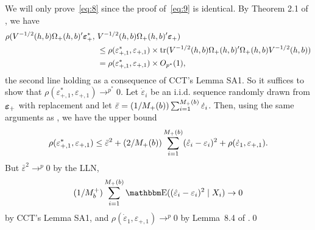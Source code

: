 \documentclass[12pt,fleqn]{article}
\begin{document}
We will only prove~\eqref{eq:8} since the proof of~\eqref{eq:9} is
identical. By Theorem 2.1 of \cite{freedman1981}, we have
\begin{align*}
  \rho(V^{-1/2}(h,b) \Omega_+(h,b)'\epb_{+}^{*},\
  &V^{-1/2}(h,b) \Omega_+(h,b)'\epb_{+}) \\
  &\leq \rho(\varepsilon_{+,1}^{*}, \varepsilon_{+,1}) \times
    \tr(V^{-1/2}(h,b) \Omega_+(h,b)' \Omega_+(h,b)V^{-1/2}(h,b)) \\
  &= \rho(\varepsilon_{+,1}^{*}, \varepsilon_{+,1}) \times O_{p^{*}}(1),
\end{align*}
the second line holding as a consequence of CCT's Lemma SA1. So it suffices
to show that $\rho(\varepsilon_{+,1}^{*}, \varepsilon_{+,1}) \to^{p^{*}} 0$. Let
$\dot{\varepsilon}_i$ be an i.i.d. sequence randomly drawn from $\epb_+$
with replacement and let
$\bar{\varepsilon} = (1/M_+(b)) \osum[+]{i}{b} \dot{\varepsilon}_i$. Then,
using the same arguments as \cite{freedman1981}, we have the upper bound
\begin{equation*}
  \rho(\varepsilon_{+,1}^*, \varepsilon_{+,1})
  \leq
  \bar\varepsilon^2 +
  (2/M_+(b)) \osum[+]{i}{b} (\hat\varepsilon_i - \varepsilon_i)^2
  + \rho(\dot\varepsilon_1, \varepsilon_{+,1}).
\end{equation*}
But $\bar\varepsilon^2 \to^p 0$ by the LLN,
\[
  (1/M_{b}^+) \osum[+]{i}{b}
  \E((\hat\varepsilon_i - \varepsilon_i)^2 \mid X_i) \to 0
\]
by CCT's Lemma SA1, and
$\rho(\dot\varepsilon_1, \varepsilon_{+,1}) \to^p 0$ by Lemma~8.4 of
\cite{bickel1981}.\qed

\clearpage


\end{document}
